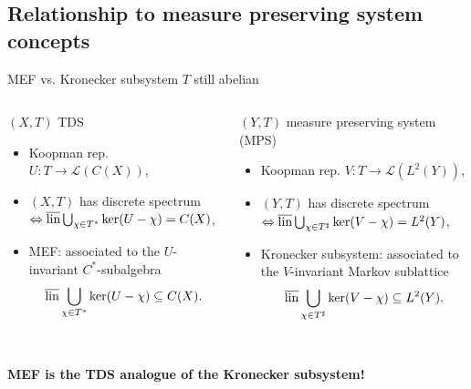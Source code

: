 \subsection{Relationship to measure preserving system concepts}
\begin{frame}{MEF vs. Kronecker subsystem}
  $T$ still abelian
  \begin{columns}[T]
    \begin{column}{0.5\textwidth}
      $(X,T)$ TDS
      \begin{itemize}
        \item {} Koopman rep. $U : T \to \mathscr{L}(C(X))$,
        \item {}$(X,T)$ has discrete spectrum $\Leftrightarrow \overline{\operatorname{lin}} \bigcup_{\chi \in T^*} \ker (U- \chi) = C(X)$,
        \item {} MEF: associated to the $U$-invariant $C^*$-subalgebra
          \begin{equation*}
            \overline{\operatorname{lin}} \bigcup_{\chi \in T^*} \ker (U- \chi)  \subseteq C(X).
          \end{equation*}
      \end{itemize}
    \end{column}
\begin{column}{0.5\textwidth}
  $(Y,T)$ measure preserving system (MPS)
  \begin{itemize}
    \item {} Koopman rep. $V: T \to \mathscr{L}(L^2(Y))$,
    \item {}$(Y,T)$ has discrete spectrum $\Leftrightarrow \overline{\operatorname{lin}} \bigcup_{\chi \in T^\sharp} \ker (V- \chi) = L^2(Y)$,
    \item {} Kronecker subsystem: associated to the $V$-invariant Markov sublattice 
      \begin{equation*}
        \overline{\operatorname{lin}} \bigcup_{\chi \in T^\sharp} \ker (V- \chi)  \subseteq L^2(Y).
      \end{equation*}
  \end{itemize}
    \end{column}
  \end{columns}
  \centering
  \phantom{a}\\
  \textbf{MEF is the TDS analogue of the Kronecker subsystem!}
\end{frame}
